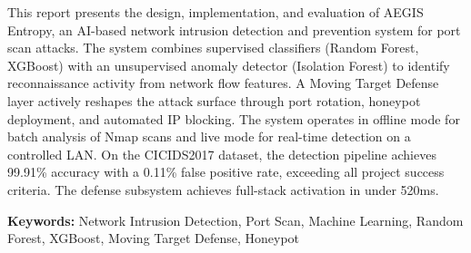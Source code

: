 \documentclass[12pt,a4paper]{report}
\begin{document}
This report presents the design, implementation, and evaluation of AEGIS Entropy, an AI-based network intrusion detection and prevention system for port scan attacks. The system combines supervised classifiers (Random Forest, XGBoost) with an unsupervised anomaly detector (Isolation Forest) to identify reconnaissance activity from network flow features. A Moving Target Defense layer actively reshapes the attack surface through port rotation, honeypot deployment, and automated IP blocking. The system operates in offline mode for batch analysis of Nmap scans and live mode for real-time detection on a controlled LAN. On the CICIDS2017 dataset, the detection pipeline achieves 99.91\% accuracy with a 0.11\% false positive rate, exceeding all project success criteria. The defense subsystem achieves full-stack activation in under 520ms.

\vspace{1em}
\noindent\textbf{Keywords:} Network Intrusion Detection, Port Scan, Machine Learning, Random Forest, XGBoost, Moving Target Defense, Honeypot

\tableofcontents
\listoffigures
\listoftables
\newpage














\end{document}
